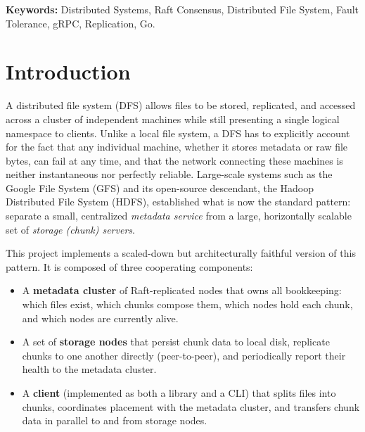 \documentclass[12pt,a4paper]{report}
\begin{document}
\vspace{0.5cm}
\textbf{Keywords:} Distributed Systems, Raft Consensus, Distributed File System, Fault Tolerance, gRPC, Replication, Go.

\tableofcontents
\listoffigures
\listoftables

\chapter{Introduction}

A distributed file system (DFS) allows files to be stored, replicated, and accessed across a cluster of independent machines while still presenting a single logical namespace to clients. Unlike a local file system, a DFS has to explicitly account for the fact that any individual machine, whether it stores metadata or raw file bytes, can fail at any time, and that the network connecting these machines is neither instantaneous nor perfectly reliable. Large-scale systems such as the Google File System (GFS) and its open-source descendant, the Hadoop Distributed File System (HDFS), established what is now the standard pattern: separate a small, centralized \emph{metadata service} from a large, horizontally scalable set of \emph{storage (chunk) servers}.

This project implements a scaled-down but architecturally faithful version of this pattern. It is composed of three cooperating components:

\begin{itemize}[nosep]
    \item A \textbf{metadata cluster} of Raft-replicated nodes that owns all bookkeeping: which files exist, which chunks compose them, which nodes hold each chunk, and which nodes are currently alive.
    \item A set of \textbf{storage nodes} that persist chunk data to local disk, replicate chunks to one another directly (peer-to-peer), and periodically report their health to the metadata cluster.
    \item A \textbf{client} (implemented as both a library and a CLI) that splits files into chunks, coordinates placement with the metadata cluster, and transfers chunk data in parallel to and from storage nodes.
\end{itemize}
\end{document}
